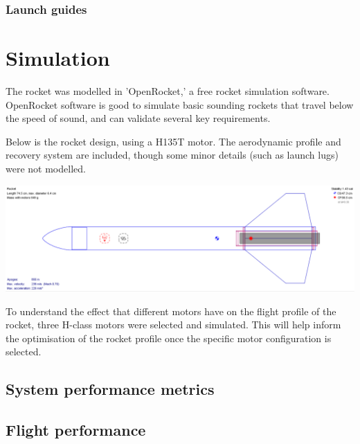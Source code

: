 \documentclass{article}
\begin{document}
\subsubsection{Launch guides}


\section{Simulation}

The rocket was modelled in 'OpenRocket,' a free rocket simulation software. OpenRocket software is good to simulate basic sounding rockets that travel below the speed of sound, and can validate several key requirements.

Below is the rocket design, using a H135T motor. The aerodynamic profile and recovery system are included, though some minor details (such as launch lugs) were not modelled.

\includegraphics[width=\textwidth]{rocket model 7-5-23.png}

To understand the effect that different motors have on the flight profile of the rocket, three H-class motors were selected and simulated. This will help inform the optimisation of the rocket profile once the specific motor configuration is selected.

\subsection{System performance metrics}


\subsection{Flight performance}

\end{document}
